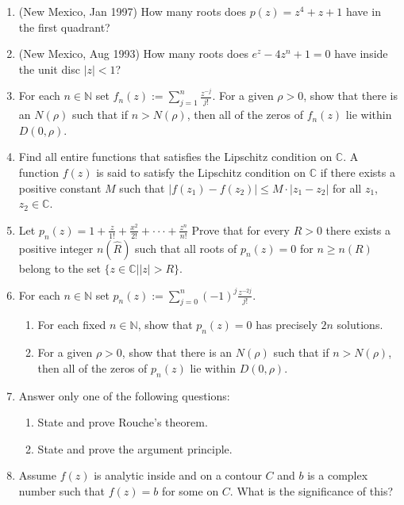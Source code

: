 \documentclass[a4paper,10pt]{article}
\begin{document}
\begin{enumerate}
	
	\item (New Mexico, Jan 1997) How many roots does $p(z) = z^4 + z + 1$ have in the first quadrant?
	
	\item (New Mexico, Aug 1993)
	How many roots does $e^z - 4z^n +1 =0$ have inside the unit disc $\vert z \vert < 1$?
	
	  \item For each $n\in\mathbb{N}$ set
	$f_{n}(z):=\sum_{j=1}^{n}\frac{z^{-j}}{j!}$. For a given $\rho>0$, show that there is an $N(\rho)$
	such that if $n>N(\rho)$, then all of the zeros of $f_{n}(z)$ lie within $D(0,\rho)$.
	
	\item Find all entire functions that satisfies the Lipschitz condition on $\mathbb{C}$. A function $f(z)$ is said to satisfy the Lipschitz condition on $\mathbb{C}$ if there exists a positive constant $M$ such that $|f(z_{1})-f(z_{2})|\le M\cdot|z_{1}-z_{2}|$ for all $z_{1}$, $z_{2}\in \mathbb{C}$.
	
	\item Let $p_{n}(z)=1+\frac{z}{1!}+\frac{x^{2}}{2!}+\cdot\cdot\cdot+\frac{z^{n}}{n!}$ Prove that for every $R>0$ there exists a positive integer $n(\hat{R})$ such that all roots of $p_{n}(z)=0$ for $n\ge n(R)$ belong to the set $\{z\in\mathbb{C}||z|>R\}$.
	
	\item For each $n\in\mathbb{N}$ set $p_{n}(z):=\sum_{j=0}^{n}(-1)^{j}\frac{z^{-2j}}{j!}$.
	\begin{enumerate}
		\item For each fixed $n\in\mathbb{N}$, show that $p_{n}(z)=0$ has precisely $2n$ solutions.
		\item For a given $\rho>0$, show that there is an $N(\rho)$ such that if $n>N(\rho)$, then all of the zeros of $p_{n}(z)$ lie within $D(0,\rho)$.
	\end{enumerate}
	
	\item Answer only one of the following questions:
	\begin{enumerate}
		\item State and prove Rouche's theorem.
		\item State and prove the argument principle.
	\end{enumerate}
	
	\item Assume $f(z)$ is analytic inside and on a contour $C$ and $b$ is a complex number such that $f(z)=b$ for some on $C$. What is the significance of this?
	

\end{enumerate}
\end{document}
